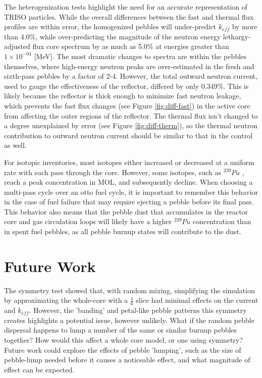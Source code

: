 The heterogenization tests highlight the need for an accurate representation of TRISO particles.  While the overall differences between the fast and thermal flux profiles are within error, the homogenized pebbles will under-predict $k_{eff}$ by more than 4.0\%, while over-predicting the magnitude of the neutron energy lethargy-adjusted flux core spectrum by as much as 5.0\% at energies greater than $1 \times 10^{-04}$ [MeV].  The most dramatic changes to spectra are within the pebbles themselves, where high-energy neutron peaks are over-estimated in the fresh and sixth-pass pebbles by a factor of 2-4.  However, the total outward neutron current, used to gauge the effectiveness of the reflector, differed by only 0.349\%.  This is likely because the reflector is thick enough to minimize fast neutron leakage, which prevents the fast flux changes (see Figure \ref{fig:diff-fast}) in the active core from affecting the outer regions of the reflector. The thermal flux isn't changed to a degree unexplained by error (see Figure \ref{fig:diff-therm}), so the thermal neutron contribution to outward neutron current should be similar to that in the control as well.

For isotopic inventories, most isotopes either increased or decreased at a uniform rate with each pass through the core.  However, some isotopes, such as $^{239}Pu$ , reach a peak concentration in MOL, and subsequently decline.  When choosing a multi-pass cycle over an \acrfull{otto} fuel cycle, it is important to remember this behavior in the case of fuel failure that may require ejecting a pebble before its final pass.  This behavior also means that the pebble dust that accumulates in the reactor core and gas circulation loops will likely have a higher $^{239}Pu$ concentration than in spent fuel pebbles, as all pebble burnup states will contribute to the dust.


\section{Future Work}

The symmetry test showed that, with random mixing, simplifying the simulation by approximating the whole-core with a $\frac{1}{6}$ slice had minimal effects on the current and $k_{eff}$.  However, the 'banding' and petal-like pebble patterns this symmetry creates highlights a potential issue, however unlikely.  What if the random pebble dispersal happens to lump a number of the same or similar burnup pebbles together?  How would this affect a whole core model, or one using symmetry?  Future work could explore the effects of pebble 'lumping', such as the size of pebble-lump needed before it causes a noticeable effect, and what magnitude of effect can be expected.

